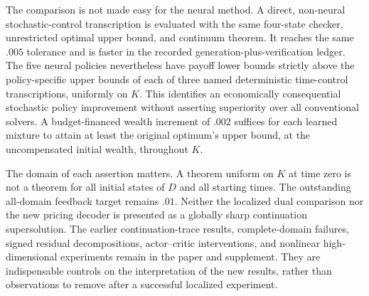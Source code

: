 The comparison is not made easy for the neural method. A direct, non-neural stochastic-control transcription is evaluated with the same four-state checker, unrestricted optimal upper bound, and continuum theorem. It reaches the same $.005$ tolerance and is faster in the recorded generation-plus-verification ledger. The five neural policies nevertheless have payoff lower bounds strictly above the policy-specific upper bounds of each of three named deterministic time-control transcriptions, uniformly on $K$. This identifies an economically consequential stochastic policy improvement without asserting superiority over all conventional solvers. A budget-financed wealth increment of $.002$ suffices for each learned mixture to attain at least the original optimum's upper bound, at the uncompensated initial wealth, throughout $K$.

The domain of each assertion matters. A theorem uniform on $K$ at time zero is not a theorem for all initial states of $D$ and all starting times. The outstanding all-domain feedback target remains $.01$. Neither the localized dual comparison nor the new pricing decoder is presented as a globally sharp continuation supersolution. The earlier continuation-trace results, complete-domain failures, signed residual decompositions, actor--critic interventions, and nonlinear high-dimensional experiments remain in the paper and supplement. They are indispensable controls on the interpretation of the new results, rather than observations to remove after a successful localized experiment.
